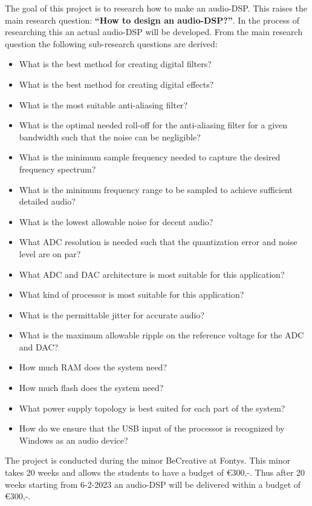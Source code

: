 The goal of this project is to research how to make an audio-DSP. 
This raises the main research question: \textbf{“How to design an audio-DSP?”}. 
In the process of researching this an actual audio-DSP will be developed. 
From the main research question the following sub-research questions are derived:

\begin{itemize}
	\setlength\itemsep{-0.3em}
	\item What is the best method for creating digital filters?
	\item What is the best method for creating digital effects?
	\item What is the most suitable anti-aliasing filter?
	\item What is the optimal needed roll-off for the anti-aliasing filter for a given bandwidth such that the noise can be negligible?
	\item What is the minimum sample frequency needed to capture the desired frequency spectrum?
	\item What is the minimum frequency range to be sampled to achieve sufficient detailed audio?
	\item What is the lowest allowable noise for decent audio?
	\item What ADC resolution is needed such that the quantization error and noise level are on par?
	\item What ADC and DAC architecture is most suitable for this application?
	\item What kind of processor is most suitable for this application?
	\item What is the permittable jitter for accurate audio?
	\item What is the maximum allowable ripple on the reference voltage for the ADC and DAC?
	\item How much RAM does the system need?
	\item How much flash does the system need?
	\item What power supply topology is best suited for each part of the system?
	\item How do we ensure that the USB input of the processor is recognized by Windows as an audio device?
\end{itemize}

\noindent The project is conducted during the minor BeCreative at Fontys. 
This minor takes 20 weeks and allows the students to have a budget of €300,-. 
Thus after 20 weeks starting from 6-2-2023 an audio-DSP will be delivered within a budget of €300,-.

